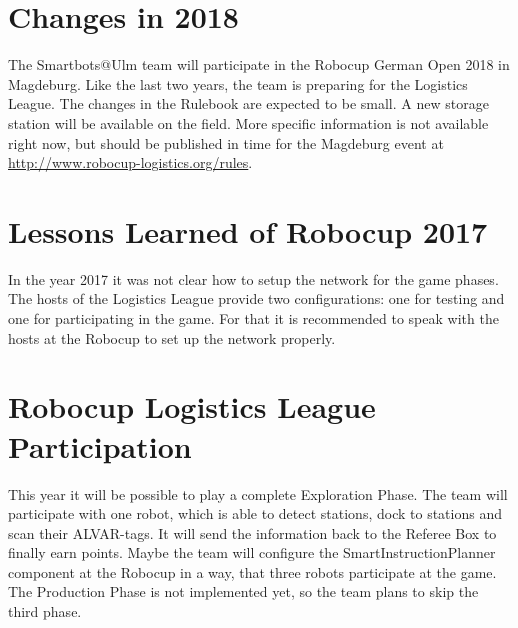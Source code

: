 \section{Changes in 2018}

The Smartbots@Ulm team will participate in the Robocup German Open 2018 in Magdeburg. Like the last two years, the team is preparing for the Logistics League. The changes in the Rulebook are expected to be small. A new storage station will be available on the field. More specific information is not available right now, but should be published in time for the Magdeburg event at \url{http://www.robocup-logistics.org/rules}.


\section{Lessons Learned of Robocup 2017}

In the year 2017 it was not clear how to setup the network for the game phases. The hosts of the Logistics League provide two configurations: one for testing and one for participating in the game. For that it is recommended to speak with the hosts at the Robocup to set up the network properly.


\section{Robocup Logistics League Participation}

This year it will be possible to play a complete Exploration Phase. The team will participate with one robot, which is able to detect stations, dock to stations and scan their ALVAR-tags. It will send the information back to the Referee Box to finally earn points. Maybe the team will configure the SmartInstructionPlanner component at the Robocup in a way, that three robots participate at the game. The Production Phase is not implemented yet, so the team plans to skip the third phase.
